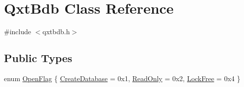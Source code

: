 \hypertarget{class_qxt_bdb}{\section{Qxt\-Bdb Class Reference}
\label{class_qxt_bdb}
}


{\ttfamily \#include $<$qxtbdb.\-h$>$}

\subsection*{Public Types}
\begin{DoxyCompactItemize}
\item 
enum \hyperlink{class_qxt_bdb_a5ad90b31cad64fcaa2664bf456c694e0}{Open\-Flag} \{ \hyperlink{class_qxt_bdb_a5ad90b31cad64fcaa2664bf456c694e0a5cdcd2672abc85b9b69c8e29de69d6b3}{Create\-Database} = 0x1, 
\hyperlink{class_qxt_bdb_a5ad90b31cad64fcaa2664bf456c694e0a08e4dc60c860b3a5b1f769fd40d8375c}{Read\-Only} = 0x2, 
\hyperlink{class_qxt_bdb_a5ad90b31cad64fcaa2664bf456c694e0a9a9502d4dec9d2d0429ef0daf1a51a66}{Lock\-Free} = 0x4
 \}
\end{DoxyCompactItemize}
